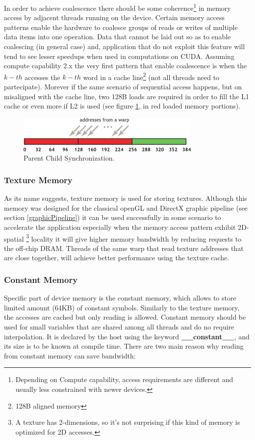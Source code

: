 In order to achieve coalescence there should be some
coherence\footnote{Depending on Compute capability, access requirements are
different and usually less constrained with newer devices.} in memory access by
adjacent threads running on the device.
Certain memory access patterns enable the hardware to coalesce groups of reads
or writes of multiple data items into one operation. Data that cannot be laid
out so as to enable coalescing (in general case) and, application that do not
exploit this feature will tend to see lesser speedups when used in computations
on CUDA.
Assuming compute capability 2.x the very first pattern that enable coalescence
is when the \(k-th\) accesses the \(k-th\) word in a cache line\footnote{128B
aligned memory} (not all threads need to partecipate).
Morever if the same scenario of sequential access happens, but on misaligned
with the cache line, two 128B loads are required in order to fill the L1 cache
or even more if L2 is used (see figure \ref{fig:misaligedCoalescence}, in red
loaded memory portions).
\begin{figure}
\centering
\includegraphics[scale=1.0]{./images/unaligned-sequential-addresses}
\caption{Parent Child Synchronization.}\label{fig:misaligedCoalescence}
\end{figure}


 
\subsubsection{Texture Memory}
As its name suggests, texture memory is used for storing textures.
Although this memory was designed for the classical openGL and DirectX graphic
pipeline (see section \ref{graphicPipeline}) it can be used successfully in some scenario to
accelerate the application especially when the memory access pattern exhibit
2D-spatial \footnote{A texture has
2-dimensions, so it's not surprising if this kind of memory is optimized
for 2D accesses.} locality it will give higher memory bandwidth by reducing requests to
the off-chip DRAM. Threads of the same warp that read texture addresses that are
close together, will achieve better performance using the texture
cache\cite{NvidiaprogGuide}. 

\subsubsection{Constant Memory}\label{sect:constantmemory}
Specific part of device memory is the constant memory, which allows to store limited
amount (64KB) of constant symbols. Similarly to the texture memory, the accesses
are cached but only reading is allowed. Constant memory should be used for small
variables that are shared among all threads and do no require interpolation.
It is declared by the host using the keyword \textbf{\_\_constant\_\_}, and its
size is to be known at compile time. There are two main reason why reading from
constant memory can save bandwidth:

